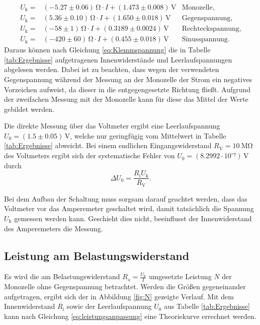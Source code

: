 \begin{align}
U_\mathup{k}=&(-5.27\pm0.06)\,\si{\ohm}\cdot I+(1.473\pm0.008)\,\si{\volt} &\text{Monozelle},\\
U_\mathup{k}=&(5.36\pm0.10)\,\si{\ohm}\cdot I+(1.650\pm0.018)\,\si{\volt} &\text{Gegenspannung},\\
U_\mathup{k}=&(-58\pm1)\,\si{\ohm}\cdot I+(0.3189\pm0.0024)\,\si{\volt} &\text{Rechteckspannung},\\
U_ \mathup{k}=&(-420\pm60)\,\si{\ohm}\cdot I +(0.455\pm0.018)\,\si{\volt} &\text{Sinusspannung}.
\end{align}
Daraus können nach Gleichung \eqref{eq:Klemmspannung} die in Tabelle \ref{tab:Ergebnisse} aufgetragenen Innenwiderstände und Leerlaufspannungen abgelesen werden. Dabei ist zu beachten, dass wegen der verwendeten Gegenspannung während der Messung an der Monozelle der Strom ein negatives Vorzeichen aufweist, da dieser in die entgegengesetzte Richtung fließt. Aufgrund der zweifachen Messung mit der Monozelle kann für diese das Mittel der Werte gebildet werden. 

\newpage
Die direkte Messung über das Voltmeter ergibt eine Leerlaufspannung \\$U_0=(1.5\pm0.05)\,\si{\volt}$, welche nur geringfügig vom Mittelwert in Tabelle \ref{tab:Ergebnisse} abweicht. Bei einem endlichen Eingangswiderstand $R_\mathup{V}=\SI{10}{\mega\ohm}$ des Voltmeters ergibt sich der systematische Fehler von $U_0=(8.2992\cdot10⁻⁷)\,\si{\volt}$ durch
\begin{equation}
\Delta{U_0}=\frac{R_\mathup{i}U_\mathup{k}}{R_\mathup{V}}.
\end{equation}

Bei dem Aufbau der Schaltung muss sorgsam darauf geachtet werden, dass das Voltmeter vor das Amperemeter geschaltet wird, damit tatsächlich die Spannung $U_\mathup{k}$ gemessen werden kann. Geschieht dies nicht, beeinflusst der Innenwiderstand des Amperemeters die Messung.
\newpage
\subsection{Leistung am Belastungswiderstand}

Es wird die am Belastungswiderstand $R_\mathup{a}=\frac{U_\mathup{k}}{I}$ umgesetzte Leistung $N$ der Monozelle ohne Gegenspannung betrachtet.
Werden die Größen gegeneinander aufgetragen, ergibt sich der in Abbildung \ref{fig:N} gezeigte Verlauf. Mit dem Innenwiderstand $R_\mathup{i}$ sowie der Leerlaufspannung $U_0$ aus Tabelle \ref{tab:Ergebnisse} kann nach Gleichung \eqref{eq:leistungsanpassung} eine Theoriekurve errechnet werden.

